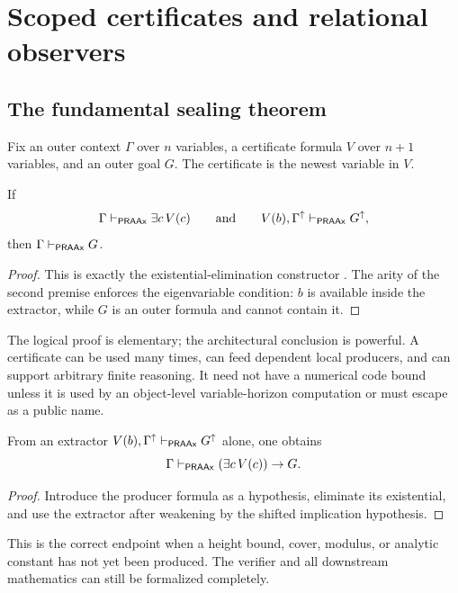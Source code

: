 \section{Scoped certificates and relational observers}
\label{sec:scopes}

\subsection{The fundamental sealing theorem}

Fix an outer context \(\Gamma\) over \(n\) variables, a certificate formula
\(V\) over \(n+1\) variables, and an outer goal \(G\).  The certificate is the
newest variable in \(V\).

\begin{theorem}
\label{thm:scoped-realization}
If
\[
  \Gamma\mathrel{\vdash_{\mathsf{PRAAx}}}\exists c\,V(c)
  \qquad\text{and}\qquad
  V(b),\Gamma^{\mathord{\uparrow}}\mathrel{\vdash_{\mathsf{PRAAx}}} G^{\mathord{\uparrow}},
\]
then \(\Gamma\mathrel{\vdash_{\mathsf{PRAAx}}} G\).
\end{theorem}

\begin{proof}
This is exactly the existential-elimination constructor .  The
arity of the second premise enforces the eigenvariable condition: \(b\) is
available inside the extractor, while \(G\) is an outer formula and cannot
contain it.
\end{proof}

The logical proof is elementary; the architectural conclusion is powerful.  A
certificate can be used many times, can feed dependent local producers, and
can support arbitrary finite reasoning.  It need not have a numerical code
bound unless it is used by an object-level variable-horizon computation or
must escape as a public name.

\begin{corollary}
\label{cor:conditional}
From an extractor
\(V(b),\Gamma^{\mathord{\uparrow}}\mathrel{\vdash_{\mathsf{PRAAx}}} G^{\mathord{\uparrow}}\) alone, one obtains
\[
  \Gamma\mathrel{\vdash_{\mathsf{PRAAx}}} (\exists c\,V(c))\to G.
\]
\end{corollary}

\begin{proof}
Introduce the producer formula as a hypothesis, eliminate its existential, and
use the extractor after weakening by the shifted implication hypothesis.
\end{proof}

This is the correct endpoint when a height bound, cover, modulus, or analytic
constant has not yet been produced.  The verifier and all downstream
mathematics can still be formalized completely.

